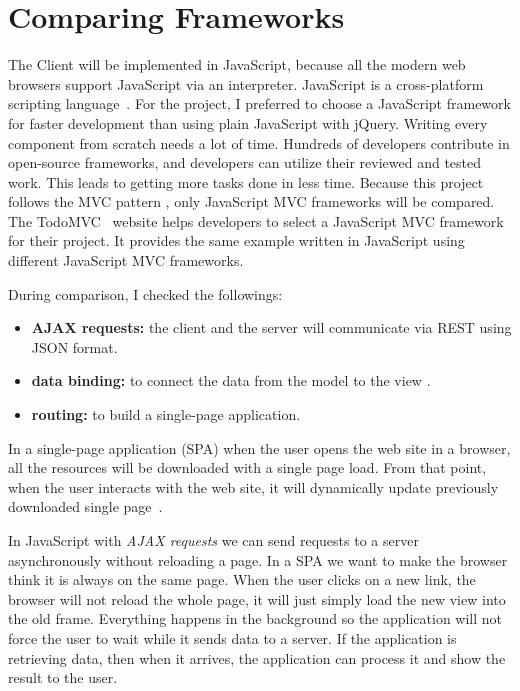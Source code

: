 \chapter{Comparing Frameworks}
\label{comparing-frameworks}

The Client will be implemented in JavaScript, because all the modern web browsers support JavaScript via an interpreter. JavaScript is a cross-platform scripting language~\cite{aaf}. For the project, I preferred to choose a JavaScript framework for faster development than using plain JavaScript with jQuery. Writing every component from scratch needs a lot of time. Hundreds of developers contribute in open-source frameworks, and developers can utilize their reviewed and tested work. This leads to getting more tasks done in less time. Because this project follows the MVC pattern , only JavaScript MVC frameworks will be compared. The TodoMVC~\cite{TodoMVC} website helps developers to select a JavaScript MVC framework for their project. It provides the same example written in JavaScript using different JavaScript MVC frameworks.

During comparison, I checked the followings:
\begin{itemize}
	\item \textbf{AJAX requests:} the client and the server  will communicate via REST using JSON format.
	\item \textbf{data binding:} to connect the data from the model to the view .
	\item \textbf{routing:} to build a single-page application.
\end{itemize}


In a single-page application (SPA) when the user opens the web site in a browser, all the resources will be downloaded with a single page load. From that point, when the user interacts with the web site, it will dynamically update previously downloaded single page~\cite{SPA}.

In JavaScript with \emph{AJAX requests} we can send requests to a server asynchronously without reloading a page. In a SPA we want to make the browser think it is always on the same page. When the user clicks on a new link, the browser will not reload the whole page, it will just simply load the new view into the old frame. Everything happens in the background so the application will not force the user to wait while it sends data to a server. If the application is retrieving data, then when it arrives, the application can process it and show the result to the user.

